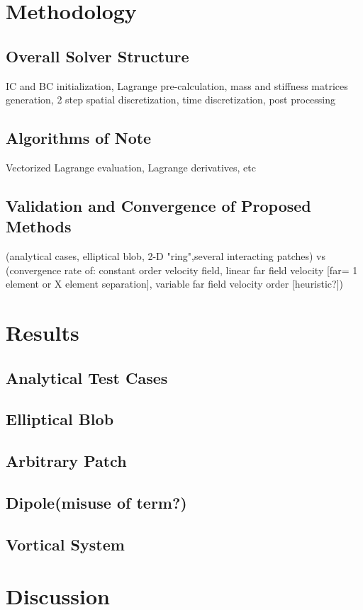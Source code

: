 \documentclass[letterpaper,12pt]{report}
\begin{document}
\chapter{Methodology}
\section{Overall Solver Structure}
IC and BC initialization, Lagrange pre-calculation, mass and stiffness matrices generation, 2 step spatial discretization, time discretization, post processing
\section{Algorithms of Note}
Vectorized Lagrange evaluation, Lagrange derivatives, etc
\section{Validation and Convergence of Proposed Methods}
(analytical cases, elliptical blob, 2-D "ring",several interacting patches) vs (convergence rate of: constant order velocity field, linear far field velocity [far= 1 element or X element separation], variable far field velocity order [heuristic?])
\chapter{Results}
\section{Analytical Test Cases}
\section{Elliptical Blob}
\section{Arbitrary Patch}
\section{Dipole(misuse of term?)}
\section{Vortical System}
\chapter{Discussion}
\end{document}

